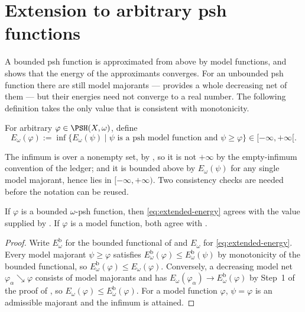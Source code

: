 \section{Extension to arbitrary psh functions}
\label{sec:ch26-extension}

A bounded psh function is approximated from above by model functions, and
 shows that the energy of the
approximants converges.  For an unbounded psh function there are still model
majorants ---  provides a whole
decreasing net of them --- but their energies need not converge to a real
number.  The following definition takes the only value that is consistent
with monotonicity.

\begin{definition}
\label{def:extended-energy}
For arbitrary \(\varphi\in\PSH(X,\omega)\), define
\begin{equation}
\label{eq:extended-energy}
 E_\omega(\varphi):=
 \inf\{E_\omega(\psi)\mid
       \psi\text{ is a psh model function and }\psi\geq\varphi\}
 \in[-\infty,+\infty[.
\end{equation}
\end{definition}

The infimum is over a nonempty set, by
, so it is not \(+\infty\) by the
empty-infimum convention of the ledger; and it is bounded above by
\(E_\omega(\psi)\) for any single model majorant, hence lies in
\([-\infty,+\infty)\).  Two consistency checks are needed before the notation
can be reused.

\begin{lemma}
\label{lem:ch26-consistency}
If \(\varphi\) is a bounded \(\omega\)-psh function, then
\eqref{eq:extended-energy} agrees with the value supplied by
.  If \(\varphi\) is a model function,
both agree with .
\end{lemma}

\begin{proof}
Write \(E^{\mathrm{b}}_\omega\) for the bounded functional of
 and \(E_\omega\) for
\eqref{eq:extended-energy}.  Every model majorant \(\psi\geq\varphi\)
satisfies \(E^{\mathrm{b}}_\omega(\varphi)\leq E_\omega^{\mathrm b}(\psi)\)
by monotonicity of the bounded functional, so
\(E^{\mathrm b}_\omega(\varphi)\leq E_\omega(\varphi)\).  Conversely, a
decreasing model net \(\varphi_\alpha\searrow\varphi\) consists of model
majorants and has \(E_\omega(\varphi_\alpha)\to
E^{\mathrm b}_\omega(\varphi)\) by Step~1 of the proof of
, so
\(E_\omega(\varphi)\leq E^{\mathrm b}_\omega(\varphi)\).  For a model
function \(\varphi\), \(\psi=\varphi\) is an admissible majorant and the
infimum is attained.
\end{proof}

